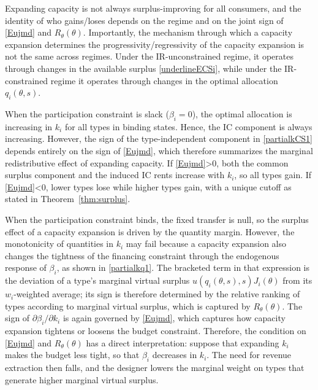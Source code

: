 \documentclass{class}
\begin{document}
Expanding capacity is not always surplus-improving for all consumers, and the identity of who gains/loses depends on the regime and on the joint sign of \ref{Eujmd} and \(R_\theta(\theta)\). Importantly, the mechanism through which a capacity expansion determines the progressivity/regressivity of the capacity expansion is not the same across regimes. Under the IR-unconstrained regime, it operates through changes in the available surplus \ref{underlineECSi}, while under the IR-constrained regime it operates through changes in the optimal allocation \(q_i(\theta,s)\).

When the participation constraint is slack (\(\beta_i=0\)), the optimal allocation is increasing in \(k_i\) for all types in binding states. Hence, the IC component is always increasing. However, the sign of the type-independent component in \ref{partialkCS1} depends entirely on the sign of \ref{Eujmd}, which therefore summarizes the marginal redistributive effect of expanding capacity. If \ref{Eujmd}>0, both the common surplus component and the induced IC rents increase with \(k_i\), so all types gain. If \ref{Eujmd}<0, lower types lose while higher types gain, with a unique cutoff as stated in Theorem~\ref{thm:surplus}.

When the participation constraint binds, the fixed transfer is null, so the surplus effect of a capacity expansion is driven by the quantity margin. However, the monotonicity of quantities in $k_i$ may fail because a capacity expansion also changes the tightness of the financing constraint through the endogenous response of \(\beta_i\), as shown in \ref{partialkq1}. The bracketed term in that expression is the deviation of a type's marginal virtual surplus \(u(q_i(\theta,s),s)J_i(\theta)\) from its \(w_i\)-weighted average; its sign is therefore determined by the relative ranking of types according to marginal virtual surplus, which is captured by \(R_\theta(\theta)\). The sign of \(\partial \beta_i/\partial k_i\) is again governed by \ref{Eujmd}, which captures how capacity expansion tightens or loosens the budget constraint. Therefore, the condition on \ref{Eujmd} and $R_\theta(\theta)$ has a direct interpretation: suppose that expanding \(k_i\) makes the budget less tight, so that \(\beta_i\) decreases in \(k_i\). The need for revenue extraction then falls, and the designer lowers the marginal weight on types that generate higher marginal virtual surplus.
\end{document}
